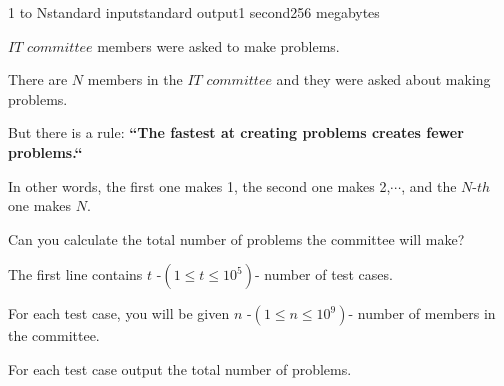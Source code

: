 \begin{problem}{1 to N}{standard input}{standard output}{1 second}{256 megabytes}

$IT$ $committee$ members were asked to make problems.

There are $N$ members in the $IT$ $committee$ and they were asked about making problems.

But there is a rule: \bf{``The fastest at creating problems creates fewer problems.``}

In other words,
the first one makes 1, the second one makes 2,$\cdots$, and the $N$-$th$ one makes $N$.

Can you calculate the total number of problems the committee will make?

\InputFile
The first line contains $t$ -$(1 \le t \le 10^5) $- number of test cases.

For each test case, you will be given $n$ -$(1\le n \le 10^9)$- number of members in the committee.

\OutputFile
For each test case output the total number of problems.

\Example

\begin{example}
%
\end{example}

\end{problem}

